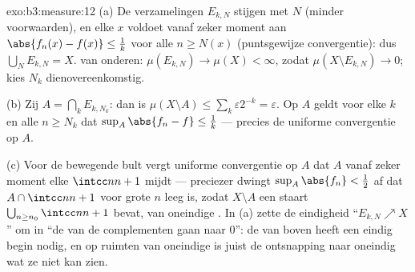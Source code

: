 \begin{solution}{exo:b3:measure:12}
(a) De verzamelingen $E_{k,N}$ stijgen met $N$ (minder
voorwaarden), en elke $x$ voldoet vanaf zeker moment aan
$\abs{f_n(x) - f(x)} \leq \frac1k$ voor alle $n \geq N(x)$
(puntsgewijze convergentie): dus $\bigcup_NE_{k,N} = X$.
 van onderen: $\mu(E_{k,N}) \to \mu(X) < \infty$,
zodat $\mu(X\setminus E_{k,N}) \to 0$; kies $N_k$
dienovereenkomstig.

(b) Zij $A = \bigcap_kE_{k,N_k}$: dan is $\mu(X\setminus A) \leq
\sum_k\varepsilon2^{-k} = \varepsilon$. Op $A$ geldt voor elke $k$
en alle $n \geq N_k$ dat $\sup_A\abs{f_n - f} \leq \frac1k$ ---
precies de uniforme convergentie op $A$.

(c) Voor de bewegende bult vergt uniforme convergentie op $A$ dat
$A$ vanaf zeker moment elke $\intcc n{n+1}$ mijdt --- preciezer
dwingt $\sup_A\abs{f_n} < \frac12$ af dat $A \cap \intcc n{n+1}$
voor grote $n$ leeg is, zodat $X \setminus A$ een staart
$\bigcup_{n\geq n_0}\intcc n{n+1}$ bevat, van oneindige . In
(a) zette de eindigheid ``$E_{k,N}\nearrow X$'' om in ``de 
van de complementen gaan naar $0$'': de  van boven
heeft een eindig begin nodig, en op ruimten van oneindige  is
juist de ontsnapping naar oneindig wat ze niet kan zien.
\end{solution}

